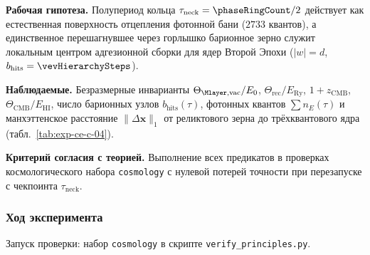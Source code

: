 \textbf{Рабочая гипотеза.}
Полупериод кольца $\tau_{\mathrm{neck}} = \phaseRingCount/2$ действует как естественная поверхность отцепления фотонной бани ($2733$ квантов), а единственное перешагнувшее через горлышко барионное зерно служит локальным центром адгезионной сборки для ядер Второй Эпохи ($|w|=d$, $b_{\mathrm{hits}}=\vevHierarchySteps$).

\textbf{Наблюдаемые.}
Безразмерные инварианты $\Theta_{\Mlayer,\mathrm{vac}}/E_0$, $\Theta_{\mathrm{rec}}/E_{\mathrm{Ry}}$, $1+z_{\mathrm{CMB}}$, $\Theta_{\mathrm{CMB}}/E_{\mathrm{HI}}$, число барионных узлов $b_{\mathrm{hits}}(\tau)$, фотонных квантов $\sum n_E(\tau)$ и манхэттенское расстояние $\|\Delta\mathbf{x}\|_1$ от реликтового зерна до трёхквантового ядра (табл.~\ref{tab:exp-ce-c-04}).

\textbf{Критерий согласия с теорией.}
Выполнение всех предикатов в проверках космологического набора \texttt{cosmology} с нулевой потерей точности при перезапуске с чекпоинта $\tau_{\mathrm{neck}}$.

\subsubsection*{Ход эксперимента}
Запуск проверки: набор \texttt{cosmology} в скрипте \texttt{verify\_principles.py}.

